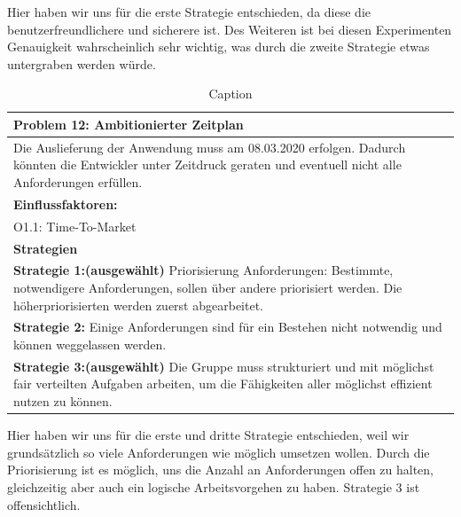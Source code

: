 \documentclass[enabledeprecatedfontcommands,fontsize=12pt,paper=a4,twoside]{scrartcl}
\begin{document}
Hier haben wir uns für die erste Strategie entschieden, da diese die benutzerfreundlichere und sicherere ist. Des Weiteren ist bei diesen Experimenten Genauigkeit wahrscheinlich sehr wichtig, was durch die zweite Strategie etwas untergraben werden würde. \\
\begin{table}[H]
    \centering
    \begin{tabular}{|p{15cm}|}
    \hline
          \textbf{Problem 12:} Ambitionierter Zeitplan
          \\ \hline
          Die Auslieferung der Anwendung muss am 08.03.2020 erfolgen. Dadurch könnten die Entwickler unter Zeitdruck geraten und eventuell nicht alle Anforderungen erfüllen.
          \\ \hline
          \textbf{Einflussfaktoren: } \\
          O1.1: Time-To-Market\\
          \hline
          \textbf{Strategien} \\ \hline
          \textbf{Strategie 1:(ausgewählt)} Priorisierung Anforderungen: Bestimmte, notwendigere Anforderungen, sollen über andere priorisiert werden. Die höherpriorisierten werden zuerst abgearbeitet. \\
          \textbf{Strategie 2:} Einige Anforderungen sind für ein Bestehen nicht notwendig und können weggelassen werden.\\
          \textbf{Strategie 3:(ausgewählt)} Die Gruppe muss strukturiert und mit möglichst fair verteilten Aufgaben arbeiten, um die Fähigkeiten aller möglichst effizient nutzen zu können. \\
    \end{tabular}
    \caption{Caption}
    \label{tab:my_label}
\end{table}
Hier haben wir uns für die erste und dritte Strategie entschieden, weil wir grundsätzlich so viele Anforderungen wie möglich umsetzen wollen. Durch die Priorisierung ist es möglich, uns die Anzahl an Anforderungen offen zu halten, gleichzeitig aber auch ein logische Arbeitsvorgehen zu haben. Strategie 3 ist offensichtlich. \\
\end{document}
